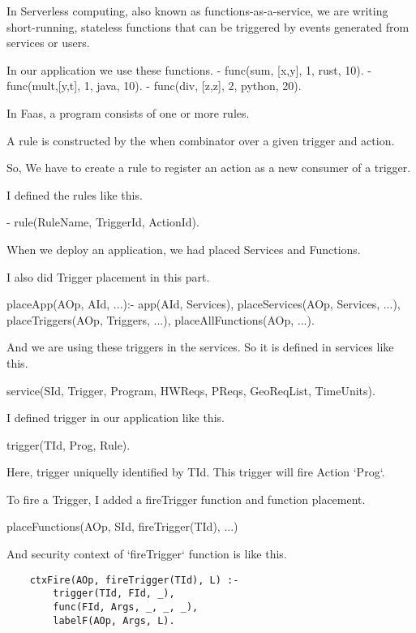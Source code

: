 \documentclass[../DraftNotes.tex]{subfiles}
\begin{document}
In Serverless computing, also known as functions-as-a-service, we are writing short-running, stateless functions that can be triggered by events generated from services or users.

In our application we use these functions.
    - func(sum, [x,y], 1, rust, 10).
    - func(mult,[y,t], 1, java, 10).
    - func(div, [z,z], 2, python, 20).


In Faas, a program consists of one or more rules. 

A rule is constructed by the when combinator over a given trigger and action.

So, We have to create a rule to register an action as a new consumer of a trigger.

I defined the rules like this.
    
    - rule(RuleName, TriggerId, ActionId).



When we deploy an application, we had placed Services and Functions. 

I also did Trigger placement in this part. 

    placeApp(AOp, AId, ...):-
        app(AId, Services),
        placeServices(AOp, Services, ...),
        placeTriggers(AOp, Triggers, ...),
        placeAllFunctions(AOp, ...).

And we are using these triggers in the services. So it is defined in services like this.

    service(SId, Trigger, Program, HWReqs, PReqs, GeoReqList, TimeUnits).


I defined trigger in our application like this.

    trigger(TId, Prog, Rule).

Here, trigger uniquelly identified by TId. This trigger will fire Action `Prog`.


To fire a Trigger, I added a fireTrigger function and function placement.

    placeFunctions(AOp, SId, fireTrigger(TId), ...)

And security context of `fireTrigger` function is like this.

\begin{verbatim}
	ctxFire(AOp, fireTrigger(TId), L) :-
        trigger(TId, FId, _),
        func(FId, Args, _, _, _),
        labelF(AOp, Args, L). 
\end{verbatim}
\end{document}
